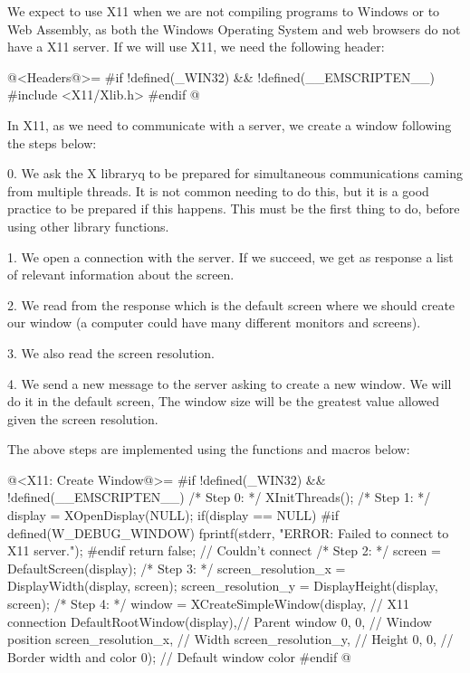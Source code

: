 We expect to use X11 when we are not compiling programs to Windows or
to Web Assembly, as both the Windows Operating System and web browsers
do not have a X11 server. If we will use X11, we need the following
header:

\iniciocodigo
@<Headers@>=
#if !defined(_WIN32) && !defined(__EMSCRIPTEN__)
#include <X11/Xlib.h>
#endif
@
\fimcodigo

In X11, as we need to communicate with a server, we create a window
following the steps below:

0. We ask the X libraryq to be prepared for simultaneous
communications caming from multiple threads. It is not common needing
to do this, but it is a good practice to be prepared if this
happens. This must be the first thing to do, before using other
library functions.

1. We open a connection with the server. If we succeed, we get as
response a list of relevant information about the screen.

2. We read from the response which is the default screen where we
should create our window (a computer could have many different
monitors and screens).

3. We also read the screen resolution.

4. We send a new message to the server asking to create a new
window. We will do it in the default screen, The window size will be
the greatest value allowed given the screen resolution.

The above steps are implemented using the functions and macros below:

\iniciocodigo
@<X11: Create Window@>=
#if !defined(_WIN32) && !defined(__EMSCRIPTEN__)
/* Step 0: */
XInitThreads();
/* Step 1: */
display = XOpenDisplay(NULL);
if(display == NULL){
#if defined(W_DEBUG_WINDOW)
  fprintf(stderr, "ERROR: Failed to connect to X11 server.\n");
#endif
  return false; // Couldn't connect
}
/* Step 2: */
screen = DefaultScreen(display);
/* Step 3: */
screen_resolution_x = DisplayWidth(display, screen);
screen_resolution_y = DisplayHeight(display, screen);
/* Step 4: */
window = XCreateSimpleWindow(display, // X11 connection
                             DefaultRootWindow(display),// Parent window
                             0, 0, // Window position
                             screen_resolution_x, // Width
                             screen_resolution_y, // Height
                             0, 0, // Border width and color
                             0); // Default window color
#endif
@
\fimcodigo

